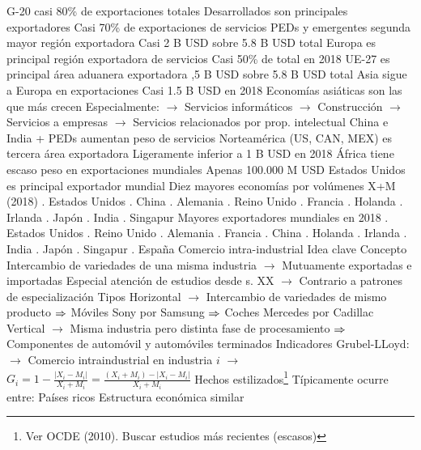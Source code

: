 \documentclass{nuevotema}
\begin{document}
\begin{esquemal}
				\4 G-20 casi 80\% de exportaciones totales
				\4 Desarrollados son principales exportadores
				\4[] Casi 70\% de exportaciones de servicios
				\4 PEDs y emergentes segunda mayor región exportadora
				\4[] Casi 2 B USD sobre 5.8 B USD total
				\4 Europa es principal región exportadora de servicios
				\4[] Casi 50\% de total en 2018
				\4 UE-27 es principal área aduanera exportadora
				,5 B USD sobre 5.8 B USD total
				\4 Asia sigue a Europa en exportaciones
				\4[] Casi 1.5 B USD en 2018
				\4 Economías asiáticas son las que más crecen
				\4[] Especialmente:
				\4[] $\to$ Servicios informáticos
				\4[] $\to$ Construcción
				\4[] $\to$ Servicios a empresas
				\4[] $\to$ Servicios relacionados por prop. intelectual
				\4 China e India + PEDs aumentan peso de servicios
				\4 Norteamérica (US, CAN, MEX) es tercera área exportadora
				\4[] Ligeramente inferior a 1 B USD en 2018
				\4 África tiene escaso peso en exportaciones mundiales
				\4[] Apenas 100.000 M USD
				\4 Estados Unidos es principal exportador mundial
				\4 Diez mayores economías por volúmenes X+M (2018)
				. Estados Unidos
				. China
				. Alemania
				. Reino Unido
				. Francia
				. Holanda
				. Irlanda
				. Japón
				. India
				. Singapur
				\4 Mayores exportadores mundiales en 2018
				. Estados Unidos
				. Reino Unido
				. Alemania
				. Francia
				. China
				. Holanda
				. Irlanda
				. India
				. Japón
				. Singapur
				. España
		\2 Comercio intra-industrial
			\3 Idea clave
				\4 Concepto
				\4[] Intercambio de variedades de una misma industria
				\4[] $\to$ Mutuamente exportadas e importadas
				\4[] Especial atención de estudios desde s. XX
				\4[] $\to$ Contrario a patrones de especialización
				\4 Tipos
				\4[] Horizontal
				\4[] $\to$ Intercambio de variedades de mismo producto
				\4[] $\Rightarrow$ Móviles Sony por Samsung
				\4[] $\Rightarrow$ Coches Mercedes por Cadillac
				\4[] Vertical
				\4[] $\to$ Misma industria pero distinta fase de procesamiento
				\4[] $\Rightarrow$ Componentes de automóvil y automóviles terminados
				\4 Indicadores
				\4[] Grubel-LLoyd:
				\4[] $\to$ Comercio intraindustrial en industria $i$
				\4[] $\to$ $G_i = 1 - \frac{\left| X_i - M_i \right|}{X_i + M_i} = \frac{(X_i + M_i) - \left| X_i - M_i \right| }{X_i + M_i}$
			\3 Hechos estilizados\footnote{Ver OCDE (2010). Buscar estudios más recientes (escasos)}
				\4[i] Típicamente ocurre entre:
				\4[] Países ricos
				\4[] Estructura económica similar

\end{esquemal}
\end{document}
